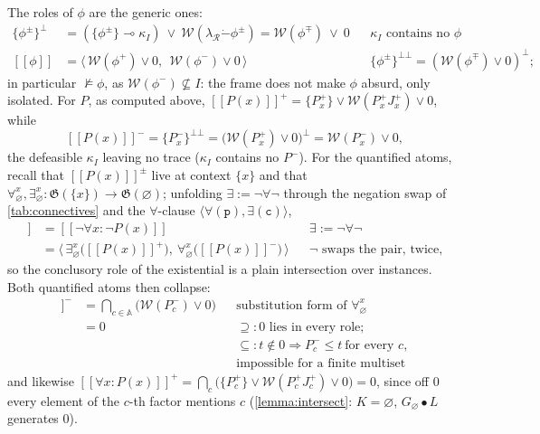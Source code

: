 \documentclass{article}
\theoremstyle{definition}
\newcommand{\A}{\mathbb{A}}
\newcommand{\G}{\mathfrak{G}}
\newcommand{\cR}{\mathcal{R}}
\newcommand{\cW}{\mathcal{W}}
\newcommand{\bbrack}[1]{[\![ #1 ]\!]}
\newcommand{\monus}{\mathbin{\dot-}}
\begin{document}
The roles of $\phi$ are the generic ones:
\begin{align*}
\{\phi^\pm\}^{\bot}
&=(\{\phi^\pm\}\multimap\kappa_I)\ \vee\ \cW(\lambda_\cR\monus\phi^\pm)
 =\cW(\phi^\mp)\ \vee\ 0
  && \kappa_I\text{ contains no }\phi\\
\bbrack{\phi}
&=\langle\,\cW(\phi^+)\vee 0,\ \ \cW(\phi^-)\vee 0\,\rangle
  && \{\phi^\pm\}^{\bot\bot}=(\cW(\phi^\mp)\vee 0)^\bot;
\end{align*}
in particular $\nvDash\phi$, as $\cW(\phi^-)\not\subseteq I$: the frame
does not make $\phi$ absurd, only isolated. For $P$, as computed above,
$\bbrack{P(x)}^+=\{P^+_x\}\vee\cW(P^+_xJ^+_x)\vee 0$, while
$$\bbrack{P(x)}^-=\{P^-_x\}^{\bot\bot}
=\bigl(\cW(P^+_x)\vee 0\bigr)^\bot=\cW(P^-_x)\vee 0,$$
the defeasible $\kappa_I$ leaving no trace ($\kappa_I$ contains no
$P^-$). For the quantified atoms, recall that
$\bbrack{P(x)}^\pm$ live at context $\{x\}$ and that
$\forall^x_\varnothing,\exists^x_\varnothing\colon
\G(\{x\})\to\G(\varnothing)$; unfolding
$\exists:=\neg\forall\neg$ through the negation swap of
\cref{tab:connectives} and the $\forall$-clause
$\langle\forall(\mathtt p),\exists(\mathtt c)\rangle$,
\begin{align*}
\bbrack{\exists x\colon P(x)}
&=\bbrack{\neg\forall x\colon\neg P(x)}
  && \exists:=\neg\forall\neg\\
&=\bigl\langle\,\exists^x_\varnothing\bigl(\bbrack{P(x)}^+\bigr),\
  \forall^x_\varnothing\bigl(\bbrack{P(x)}^-\bigr)\,\bigr\rangle
  && \neg\text{ swaps the pair, twice,}
\end{align*}
so the conclusory role of the existential is a plain intersection over
instances. Both quantified atoms then collapse:
\begin{align*}
\bbrack{\exists x\colon P(x)}^-
&=\bigcap_{c\in\A}\bigl(\cW(P^-_c)\vee 0\bigr)
  && \text{substitution form of }\forall^x_\varnothing\\
&=0
  && \supseteq\colon 0\text{ lies in every role;}\\
&&& \subseteq\colon t\notin 0\Rightarrow P^-_c\le t\ \text{for every }c,\\
&&& \text{impossible for a finite multiset}
\end{align*}
and likewise
$\bbrack{\forall x\colon P(x)}^+
=\bigcap_{c}\bigl(\{P^+_c\}\vee\cW(P^+_cJ^+_c)\vee 0\bigr)=0$, since off
$0$ every element of the $c$-th factor mentions $c$
(\cref{lemma:intersect}: $K=\varnothing$, $G_\varnothing\bullet L$
generates $0$).
\end{document}

